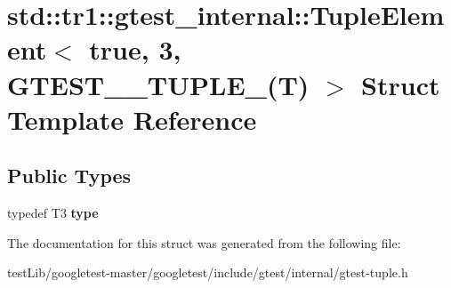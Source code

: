 \hypertarget{structstd_1_1tr1_1_1gtest__internal_1_1TupleElement_3_01true_00_013_00_01GTEST__10__TUPLE___07T_08_01_4}{}\section{std\+:\+:tr1\+:\+:gtest\+\_\+internal\+:\+:Tuple\+Element$<$ true, 3, G\+T\+E\+S\+T\+\_\+\_\+\+T\+U\+P\+L\+E\+\_\+(T) $>$ Struct Template Reference}
\label{structstd_1_1tr1_1_1gtest__internal_1_1TupleElement_3_01true_00_013_00_01GTEST__10__TUPLE___07T_08_01_4}
\subsection*{Public Types}
\begin{DoxyCompactItemize}
\item 
\mbox{\label{structstd_1_1tr1_1_1gtest__internal_1_1TupleElement_3_01true_00_013_00_01GTEST__10__TUPLE___07T_08_01_4_a0abc8519ff756a7736076063626a2718}} 
typedef T3 {\bfseries type}
\end{DoxyCompactItemize}


The documentation for this struct was generated from the following file\+:\begin{DoxyCompactItemize}
\item 
test\+Lib/googletest-\/master/googletest/include/gtest/internal/gtest-\/tuple.\+h\end{DoxyCompactItemize}
